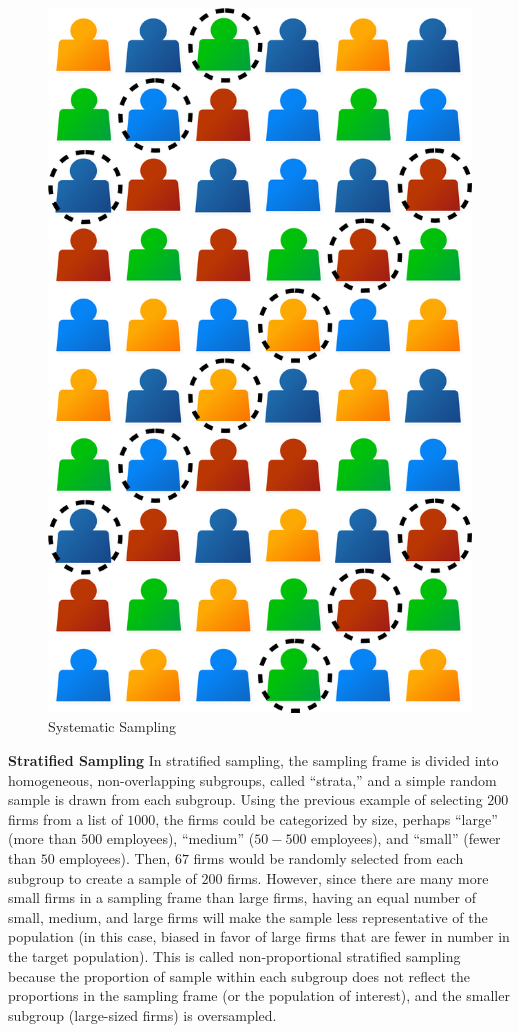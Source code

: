 \begin{figure}[H]
	\centering
	\includegraphics[width=\maxwidth{.35\linewidth}]{gfx/07-03}
	\caption{Systematic Sampling}
	\label{07:fig03}
\end{figure}

\textbf{Stratified Sampling} In stratified sampling, the sampling frame is divided into homogeneous, non-overlapping subgroups, called ``strata,'' and a simple random sample is drawn from each subgroup. Using the previous example of selecting $ 200 $ firms from a list of $ 1000 $, the firms could be categorized by size, perhaps ``large'' (more than $ 500 $ employees), ``medium'' ($ 50 - 500 $ employees), and ``small'' (fewer than $ 50 $ employees). Then, $ 67 $ firms would be randomly selected from each subgroup to create a sample of $ 200 $ firms. However, since there are many more small firms in a sampling frame than large firms, having an equal number of small, medium, and large firms will make the sample less representative of the population (in this case, biased in favor of large firms that are fewer in number in the target population). This is called non-proportional stratified sampling because the proportion of sample within each subgroup does not reflect the proportions in the sampling frame (or the population of interest), and the smaller subgroup (large-sized firms) is oversampled. 
	
